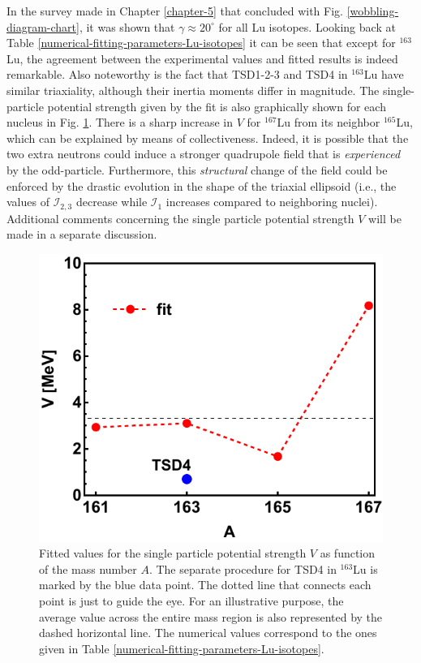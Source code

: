 In the survey made in Chapter \ref{chapter-5} that concluded with Fig. \ref{wobbling-diagram-chart}, it was shown that $\gamma\approx 20^\circ$ for all Lu isotopes. Looking back at Table \ref{numerical-fitting-parameters-Lu-isotopes} it can be seen that except for $^{163}$Lu, the agreement between the experimental values and fitted results is indeed remarkable. Also noteworthy is the fact that TSD1-2-3 and TSD4 in $^{163}$Lu have similar triaxiality, although their inertia moments differ in magnitude. The single-particle potential strength given by the fit is also graphically shown for each nucleus in Fig. \ref{fig-V-param-fitting-procedure}. There is a sharp increase in $V$ for $^{167}$Lu from its neighbor $^{165}$Lu, which can be explained by means of collectiveness. Indeed, it is possible that the two extra neutrons could induce a stronger quadrupole field that is \emph{experienced} by the odd-particle. Furthermore, this \emph{structural} change of the field could be enforced by the drastic evolution in the shape of the triaxial ellipsoid (i.e., the values of $\mathcal{I}_{2,3}$ decrease while $\mathcal{I}_1$ increases compared to neighboring nuclei). Additional comments concerning the single particle potential strength $V$ will be made in a separate discussion.
\begin{figure}
    \centering
    \includegraphics[scale=0.8]{Chapters/Figures/V-param-fitting.pdf}
    \caption{Fitted values for the single particle potential strength $V$ as function of the mass number $A$. The separate procedure for TSD4 in $^{163}$Lu is marked by the blue data point. The dotted line that connects each point is just to guide the eye. For an illustrative purpose, the average value across the entire mass region is also represented by the dashed horizontal line. The numerical values correspond to the ones given in Table \ref{numerical-fitting-parameters-Lu-isotopes}.}
    \label{fig-V-param-fitting-procedure}
\end{figure}

